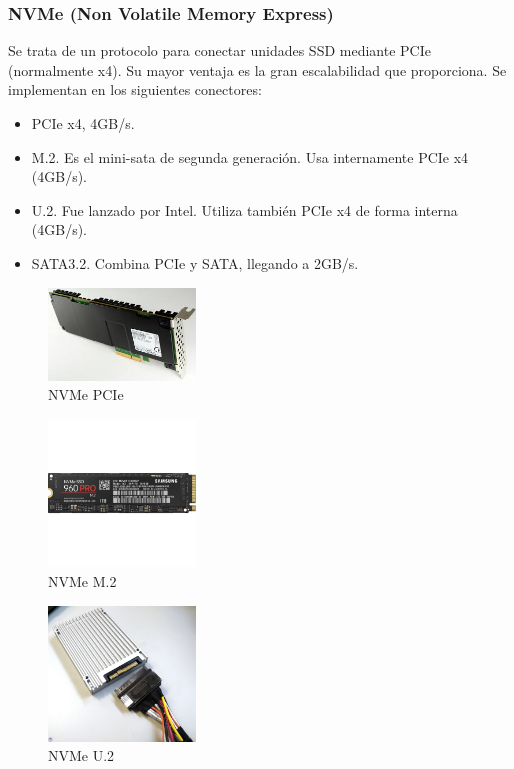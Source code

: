 \documentclass[12pt,spanish]{article}
\begin{document}
\subsubsection{NVMe (\textbf{N}on \textbf{V}olatile \textbf{M}emory \textbf{E}xpress)}
Se trata de un protocolo para conectar unidades SSD mediante PCIe (normalmente x4). Su mayor ventaja es la gran escalabilidad que proporciona. Se implementan en los siguientes conectores:
\begin{itemize}
	\item PCIe x4, 4GB/s.
	\item M.2. Es el mini-sata de segunda generación. Usa internamente PCIe x4 (4GB/s).
	\item U.2. Fue lanzado por Intel. Utiliza también PCIe x4 de forma interna (4GB/s).
	\item SATA3.2. Combina PCIe y SATA, llegando a 2GB/s.
\end{itemize}

\begin{figure}[H]
	\centering
	\includegraphics[width=0.35\textwidth]{pcienvme.jpeg}
	\caption{NVMe PCIe}
\end{figure}

\begin{figure}[H]
	\centering
	\includegraphics[width=0.35\textwidth]{m2.jpg}
	\caption{NVMe M.2}
\end{figure}

\begin{figure}[H]
	\centering
	\includegraphics[width=0.35\textwidth]{u2.jpg}
	\caption{NVMe U.2}
\end{figure}
\end{document}
